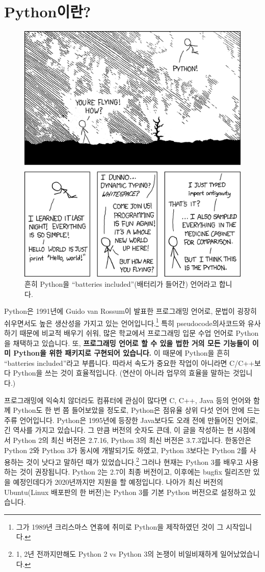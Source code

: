 \documentclass[a4paper,10pt]{memoir}
\begin{document}
\section{Python이란?}
\begin{figure}[htbp]
  \centering
  \includegraphics[width=0.6\linewidth]{./figures/xkcd_python}
  \caption*{흔히 Python을 ``batteries included''(배터리가 들어간) 언어라고 합니다.}\label{fig:meme}
\end{figure}
Python은 1991년에 Guido van Rossum이 발표한 프로그래밍 언어로, 문법이 굉장히 쉬우면서도 높은 생산성을 가지고 있는 언어입니다.\footnote{그가 1989년 크리스마스 연휴에 취미로 Python을 제작하였던 것이 그 시작입니다.}
특히 pseudocode의사코드와 유사하기 때문에 비교적 배우기 쉬워, 많은 학교에서 프로그래밍 입문 수업 언어로 Python을 채택하고 있습니다.
또, \textbf{프로그래밍 언어로 할 수 있을 법한 거의 모든 기능들이 이미 Python을 위한 패키지로 구현되어 있습니다.}
이 때문에 Python을 흔히 ``batteries included''라고 부릅니다.
따라서 속도가 중요한 작업이 아니라면 C/C++보다 Python을 쓰는 것이 효율적입니다.
(연산이 아니라 업무의 효율을 말하는 것입니다.)

프로그래밍에 익숙치 않더라도 컴퓨터에 관심이 많다면 C, C++, Java 등의 언어와 함께 Python도 한 번 쯤 들어보았을 정도로, Python은 점유율 상위 다섯 언어 안에 드는 주류 언어입니다.
Python은 1995년에 등장한 Java보다도 오래 전에 만들어진 언어로, 긴 역사를 가지고 있습니다.
그 만큼 버전의 숫자도 큰데, 이 글을 작성하는 현 시점에서 Python 2의 최신 버전은 2.7.16, Python 3의 최신 버전은 3.7.3입니다.
한동안은 Python 2와 Python 3가 동시에 개발되기도 하였고, Python 3보다는 Python 2를 사용하는 것이 낫다고 말하던 때가 있었습니다.\footnote{1, 2년 전까지만해도 Python 2 vs Python 3의 논쟁이 비일비재하게 일어났었습니다.}
그러나 현재는 Python 3를 배우고 사용하는 것이 권장됩니다.
Python 2는 2.7이 최종 버전이고, 이후에는 bugfix 릴리즈만 있을 예정인데다가 2020년까지만 지원을 할 예정입니다.
나아가 최신 버전의 Ubuntu(Linux 배포판의 한 버전)는 Python 3를 기본 Python 버전으로 설정하고 있습니다.
\end{document}
